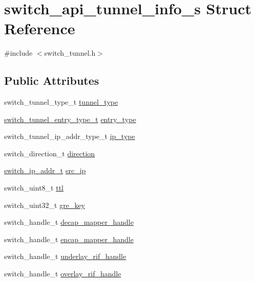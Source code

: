 \hypertarget{structswitch__api__tunnel__info__s}{\section{switch\+\_\+api\+\_\+tunnel\+\_\+info\+\_\+s Struct Reference}
\label{structswitch__api__tunnel__info__s}
}


{\ttfamily \#include $<$switch\+\_\+tunnel.\+h$>$}

\subsection*{Public Attributes}
\begin{DoxyCompactItemize}
\item 
switch\+\_\+tunnel\+\_\+type\+\_\+t \hyperlink{group__Tunnel_ga6685d34b1ba33c1f547b06b6a9237a62}{tunnel\+\_\+type}
\item 
\hyperlink{group__Tunnel_ga8c691aa3424f01425814cccd5c076e44}{switch\+\_\+tunnel\+\_\+entry\+\_\+type\+\_\+t} \hyperlink{group__Tunnel_ga08132f7df2f5c508bde52a738ea627fd}{entry\+\_\+type}
\item 
switch\+\_\+tunnel\+\_\+ip\+\_\+addr\+\_\+type\+\_\+t \hyperlink{group__Tunnel_ga216a84a9b59dfb89fcc2233add2d2dfb}{ip\+\_\+type}
\item 
switch\+\_\+direction\+\_\+t \hyperlink{group__Tunnel_gacd286841672592eab97054f29f43f797}{direction}
\item 
\hyperlink{structswitch__ip__addr__s}{switch\+\_\+ip\+\_\+addr\+\_\+t} \hyperlink{group__Tunnel_ga9be28d9bd055ac1af0f30d36dce3113e}{src\+\_\+ip}
\item 
switch\+\_\+uint8\+\_\+t \hyperlink{group__Tunnel_ga86a3834db1f6b212b027d1f652021ffc}{ttl}
\item 
switch\+\_\+uint32\+\_\+t \hyperlink{group__Tunnel_gae83720f8c95f2c463c79af35ddda9530}{gre\+\_\+key}
\item 
switch\+\_\+handle\+\_\+t \hyperlink{group__Tunnel_ga48608d8e6f79b52969707065beab3b29}{decap\+\_\+mapper\+\_\+handle}
\item 
switch\+\_\+handle\+\_\+t \hyperlink{group__Tunnel_gaf221e7b6dc190d612ae79c4a47087637}{encap\+\_\+mapper\+\_\+handle}
\item 
switch\+\_\+handle\+\_\+t \hyperlink{group__Tunnel_ga37daad6891f426ccac9ea1c7f750a443}{underlay\+\_\+rif\+\_\+handle}
\item 
switch\+\_\+handle\+\_\+t \hyperlink{group__Tunnel_ga1ad550339f0fde32bb88063b0141a0cc}{overlay\+\_\+rif\+\_\+handle}

\end{DoxyCompactItemize}
